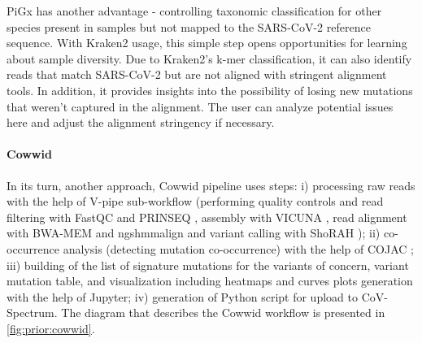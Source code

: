        PiGx has another advantage - controlling taxonomic classification for other species present in samples but not mapped to the SARS-CoV-2 reference sequence. With Kraken2 usage, this simple step opens opportunities for learning about sample diversity. Due to Kraken2's k-mer classification, it can also identify reads that match SARS-CoV-2 but are not aligned with stringent alignment tools. In addition, it provides insights into the possibility of losing new mutations that weren't captured in the alignment. The user can analyze potential issues here and adjust the alignment stringency if necessary.

        \paragraph{Cowwid}
        In its turn, another approach, Cowwid \cite{jahn2021} pipeline uses steps: i) processing raw reads with the help of V-pipe \cite{posada2021} sub-workflow (performing quality controls and read filtering with FastQC and PRINSEQ \cite{babraham,prinseq}, assembly with VICUNA \cite{vicuna2012}, read alignment with BWA-MEM and ngshmmalign \cite{li2013,ngshmmalign2021} and variant calling with ShoRAH \cite{shorah}); ii) co-occurrence analysis (detecting mutation co-occurrence) with the help of COJAC \cite{jahn2022,cojac2022}; iii) building of the list of signature mutations for the variants of concern, variant mutation table, and visualization including heatmaps and curves plots generation with the help of Jupyter; iv) generation of Python script for upload to CoV-Spectrum. The diagram that describes the Cowwid workflow is presented in \cref{fig:prior:cowwid}.
        
